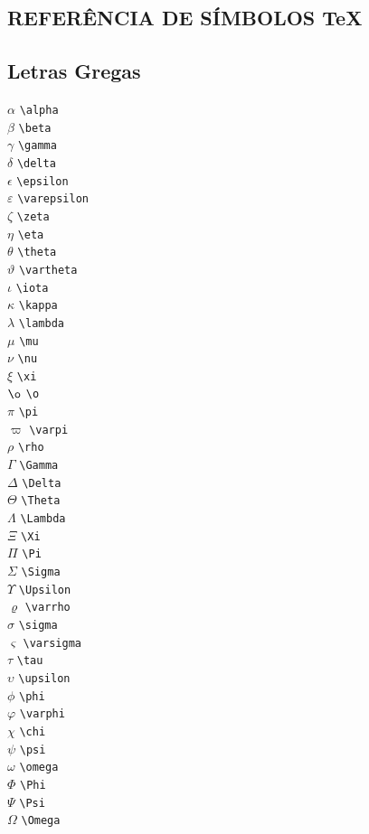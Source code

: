\documentclass[xindy,rascunho]{fei}
\begin{document}
\begin{teorema}
	\chapter{REFERÊNCIA DE SÍMBOLOS \TeX{}} \label{chap:simbolos}

\section{Letras Gregas}
\begin{multicols}{3}
\noindent
\(\alpha\) \verb+\alpha+\\
\(\beta\) \verb+\beta+\\
\(\gamma\) \verb+\gamma+\\
\(\delta\) \verb+\delta+\\
\(\epsilon\) \verb+\epsilon+\\
\(\varepsilon\) \verb+\varepsilon+\\
\(\zeta\) \verb+\zeta+\\
\(\eta\) \verb+\eta+\\
\(\theta\) \verb+\theta+\\
\(\vartheta\) \verb+\vartheta+\\
\(\iota\) \verb+\iota+\\
\(\kappa\) \verb+\kappa+\\
\(\lambda\) \verb+\lambda+\\
\(\mu\) \verb+\mu+\\
\(\nu\) \verb+\nu+\\
\(\xi\) \verb+\xi+\\
\(\o\) \verb+\o+\\
\(\pi\) \verb+\pi+\\
\(\varpi\) \verb+\varpi+\\
\(\rho\) \verb+\rho+\\
\(\Gamma\) \verb+\Gamma+\\
\(\Delta\) \verb+\Delta+\\
\(\Theta\) \verb+\Theta+\\
\(\Lambda\) \verb+\Lambda+\\
\(\Xi\) \verb+\Xi+\\
\(\Pi\) \verb+\Pi+\\
\(\Sigma\) \verb+\Sigma+\\
\(\Upsilon\) \verb+\Upsilon+\\
\(\varrho\) \verb+\varrho+\\
\(\sigma\) \verb+\sigma+\\
\(\varsigma\) \verb+\varsigma+\\
\(\tau\) \verb+\tau+\\
\(\upsilon\) \verb+\upsilon+\\
\(\phi\) \verb+\phi+\\
\(\varphi\) \verb+\varphi+\\
\(\chi\) \verb+\chi+\\
\(\psi\) \verb+\psi+\\
\(\omega\) \verb+\omega+\\
\(\Phi\) \verb+\Phi+\\
\(\Psi\) \verb+\Psi+\\
\(\Omega\) \verb+\Omega+\\
\end{multicols}


\end{teorema}
\end{document}
